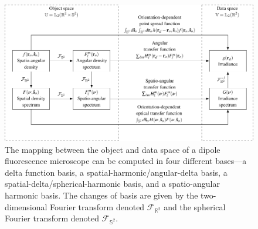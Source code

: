 \documentclass[]{osa-article}
\providecommand{\mbb}[1]{\mathbb{#1}}
\begin{document}
  \begin{figure}
  \hspace{-5em}
  \includegraphics[scale=1.0]{../figures/dipole-block/dipole-block.pdf}
  \caption{The mapping between the object and data space of a dipole
    fluorescence microscope can be computed in four different bases---a delta
    function basis, a spatial-harmonic/angular-delta basis, a
    spatial-delta/spherical-harmonic basis, and a spatio-angular harmonic basis.
    The changes of basis are given by the two-dimensional Fourier transform
    denoted $\mathcal{F}_{\mbb{R}^2}$ and the spherical Fourier transform
    denoted $\mathcal{F}_{\mbb{S}^2}$.}
   \label{fig:dipole-block}      
    \end{figure}
\end{document}
